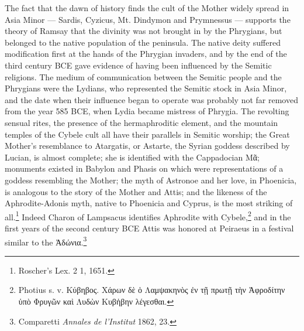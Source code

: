 \documentclass[a4paper, 11pt, oneside, polutonikogreek, french]{article}
\begin{document}
The fact that the dawn of history finds the cult of the Mother widely spread in Asia Minor --- Sardis, Cyzicus, Mt. Dindymon and Prymnessus --- supports the theory of Ramsay that the divinity was not brought in by the Phrygians, but belonged to the native population of the peninsula. The native deity suffered modification first at the hands of the Phrygian invaders, and by the end of the third century \textsc{BCE} gave evidence of having been influenced by the Semitic religions. The medium of communication between the Semitic people and the Phrygians were the Lydians, who represented the Semitic stock in Asia Minor, and the date when their influence began to operate was probably not far removed from the year 585 \textsc{BCE}, when Lydia became mistress of Phrygia. The revolting sensual rites, the presence of the hermaphroditic element, and the mountain temples of the Cybele cult all have their parallels in Semitic worship; the Great Mother's resemblance to Atargatis, or Astarte, the Syrian goddess described by Lucian, is almost complete; she is identified with the Cappadocian Μᾶ; monuments existed in Babylon and Phasis on which were representations of a goddess resembling the Mother; the myth of Astronoe and her love, in Phoenicia, is analogous to the story of the Mother and Attis; and the likeness of the Aphrodite-Adonis myth, native to Phoenicia and Cyprus, is the most striking of all.\footnote{Roscher's Lex. 2 1, 1651.} Indeed Charon of Lampsacus identifies Aphrodite with Cybele,\footnote{Photius s. v. Κύβηβος. Χάρων δὲ ὁ Λαμψακηνὸς ἐν τῇ πρωτῇ τὴν Ἀφροδίτην ὑπὸ Φρυγῶν καὶ Λυδὼν Κυβἡβην λέγεσθαι.} and in the first years of the second century \textsc{BCE} Attis was honored at Peiraeus in a festival similar to the Ἀδώνια.\footnote{Comparetti \emph{Annales de l'Institut} 1862, 23.}
 
\end{document}

